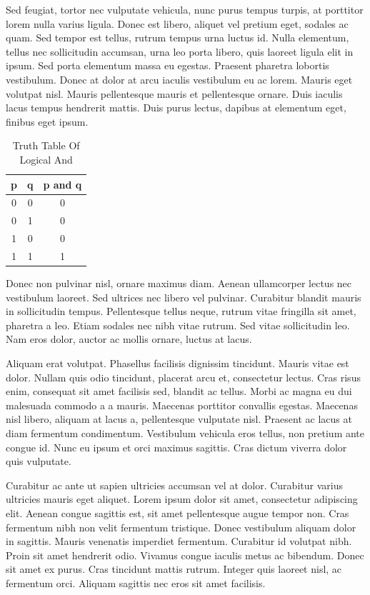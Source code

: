 \documentclass[a4paper, 12pt]{article}
\begin{document}
	Sed feugiat, tortor nec vulputate vehicula, nunc purus tempus turpis, at porttitor lorem nulla varius ligula. Donec est libero, aliquet vel pretium eget, sodales ac quam. Sed tempor est tellus, rutrum tempus urna luctus id. Nulla elementum, tellus nec sollicitudin accumsan, urna leo porta libero, quis laoreet ligula elit in ipsum. Sed porta elementum massa eu egestas. Praesent pharetra lobortis vestibulum. Donec at dolor at arcu iaculis vestibulum eu ac lorem. Mauris eget volutpat nisl. Mauris pellentesque mauris et pellentesque ornare. Duis iaculis lacus tempus hendrerit mattis. Duis purus lectus, dapibus at elementum eget, finibus eget ipsum.
	
	\begin{table}[h!]
		\centering
		\begin{tabular}{|cc|c|}
			\hline
			p & q & p and q\\\hline
			0 & 0 & 0\\
			0 & 1 & 0\\
			1 & 0 & 0\\
			1 & 1 & 1\\\hline
		\end{tabular}
		\caption{Truth Table Of Logical And}
	\end{table}
	
	{\tiny Donec non pulvinar nisl}, {\Large ornare maximus diam}. Aenean ullamcorper lectus nec vestibulum laoreet. Sed ultrices nec libero vel pulvinar. Curabitur blandit mauris in sollicitudin tempus. Pellentesque tellus neque, rutrum vitae fringilla sit amet, pharetra a leo. Etiam sodales nec nibh vitae rutrum. Sed vitae sollicitudin leo. Nam eros dolor, auctor ac mollis ornare, luctus at lacus.
	
	Aliquam erat volutpat. Phasellus facilisis dignissim tincidunt. Mauris vitae est dolor. Nullam quis odio tincidunt, placerat arcu et, consectetur lectus. Cras risus enim, consequat sit amet facilisis sed, blandit ac tellus. Morbi ac magna eu dui malesuada commodo a a mauris. Maecenas porttitor convallis egestas. Maecenas nisl libero, aliquam at lacus a, pellentesque vulputate nisl. Praesent ac lacus at diam fermentum condimentum. Vestibulum vehicula eros tellus, non pretium ante congue id. Nunc eu ipsum et orci maximus sagittis. Cras dictum viverra dolor quis vulputate.
	
	Curabitur ac ante ut sapien ultricies accumsan vel at dolor. Curabitur varius ultricies mauris eget aliquet. Lorem ipsum dolor sit amet, consectetur adipiscing elit. Aenean congue sagittis est, sit amet pellentesque augue tempor non. Cras fermentum nibh non velit fermentum tristique. Donec vestibulum aliquam dolor in sagittis. Mauris venenatis imperdiet fermentum. Curabitur id volutpat nibh. Proin sit amet hendrerit odio. Vivamus congue iaculis metus ac bibendum. Donec sit amet ex purus. Cras tincidunt mattis rutrum. Integer quis laoreet nisl, ac fermentum orci. Aliquam sagittis nec eros sit amet facilisis.
	
\end{document}
